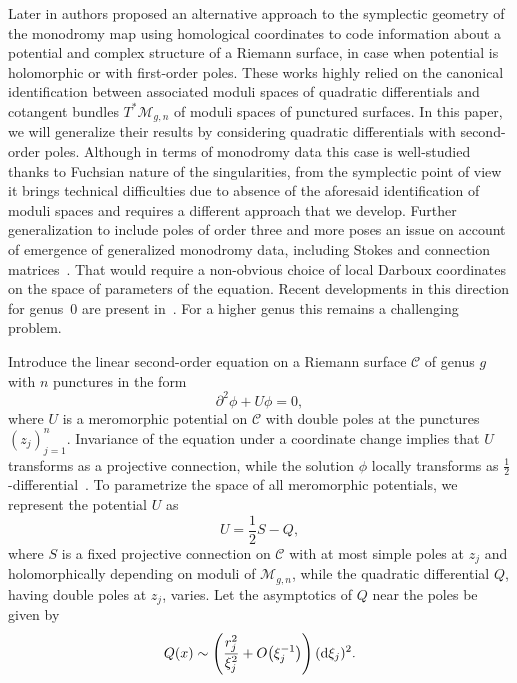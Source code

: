 \documentclass[pdftex]{sigma}
\numberwithin{equation}{section}
\theoremstyle{definition}
\begin{document}
Later in \cite{Bertola_2017, korotkin2018periods} authors proposed an alternative approach to the symplectic geometry of the monodromy map using homological coordinates to code information about a potential and complex structure of a Riemann surface, in case when potential is holomorphic or with first-order poles. These works highly relied on the canonical identification between associated moduli spaces of quadratic differentials and cotangent bundles $T^* \mathcal{M}_{g,n}$ of moduli spaces of punctured surfaces. In this paper, we will generalize their results by considering quadratic differentials with second-order poles. Although in terms of monodromy data this case is well-studied thanks to Fuchsian nature of the singularities, from the symplectic point of view it brings technical difficulties due to absence of the aforesaid identification of moduli spaces and requires a different approach that we develop. Further generalization to include poles of order three and more poses an issue on account of emergence of generalized monodromy data, including Stokes and connection matrices~\cite{Birk}. That would require a non-obvious choice of local Darboux coordinates on the space of parameters of the equation. Recent developments in this direction for genus~0 are present in~\cite{harnad}. For a higher genus this remains a challenging problem.

Introduce the linear second-order equation on a Riemann surface $\mathcal{C}$ of genus $g$ with $n$ punctures in the form
\begin{equation}\label{1}\partial^2 \phi+U\phi=0,\end{equation}
where $U$ is a meromorphic potential on $\mathcal{C}$ with double poles at the punctures $(z_j)^n_{j=1}$. Invariance of the equation under a coordinate change implies that $U$ transforms as a projective connection, while the
solution $\phi$ locally transforms as $\frac{1}{2}$-differential~\cite{halfdif}. To parametrize the space of all meromorphic potentials, we represent the potential $U$ as
\begin{equation}\label{pot}U=\frac{1}{2}S-Q,\end{equation}
where $S$ is a fixed projective connection on $\mathcal{C}$ with at most simple poles at $z_j$ and holomorphically depending on moduli of $\mathcal{M}_{g,n}$, while the quadratic differential $Q$, having double poles at $z_j$, varies. Let the asymptotics of $Q$ near the poles be given by
\begin{equation*}%
Q(x) \sim \left(\frac{r_j^2}{\xi_j^2} +O\big(\xi_j^{-1}\big)\right)({\rm d} \xi_j)^2.
\end{equation*}
\end{document}
